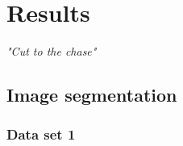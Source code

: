 \chapter{Results}
\begin{center}
\vspace{-6ex}
\textit{"Cut to the chase"}
\vspace{6ex}
\end{center}


\section{Image segmentation}

\subsection{Data set 1}


